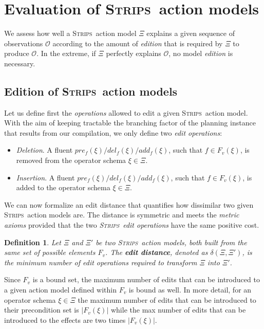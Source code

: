 \documentclass{article}
\newcommand{\strips}{\textsc{Strips}}     %
\newtheorem{definition}[theorem]{Definition}
\begin{document}
\section{Evaluation of \strips\ action models}
We assess how well a \strips\ action model $\Xi$ explains a given sequence of observations $\mathcal{O}$ according to the amount of {\em edition} that is required by $\Xi$ to produce $\mathcal{O}$. In the extreme, if $\Xi$ perfectly explains $\mathcal{O}$, no model {\em edition} is necessary.

\subsection{Edition of \strips\ action models}
Let us define first the \emph{operations} allowed to edit a given \strips\ action model. With the aim of keeping tractable the branching factor of the planning instance that results from our compilation, we only define two {\em edit operations}:
\begin{itemize}
\item {\em Deletion}. A fluent $pre_f(\xi)/del_f(\xi)/add_f(\xi)$, such that $f\in F_v(\xi)$, is removed from the operator schema $\xi\in\Xi$.
\item {\em Insertion}. A fluent $pre_f(\xi)/del_f(\xi)/add_f(\xi)$, such that $f\in F_v(\xi)$, is added to the operator schema $\xi\in\Xi$.
\end{itemize}

We can now formalize an edit distance that quantifies how dissimilar two given \strips\ action models are. The distance is symmetric and meets the {\em metric axioms} provided that the two {\em \strips\ edit operations} have the same positive cost.

\begin{definition}
Let $\Xi$ and $\Xi'$ be two \strips\ action models, both built from the same set of possible elements $F_v$. The {\bf edit distance}, denoted as $\delta(\Xi,\Xi')$, is the minimum number of {\em edit operations} required to transform $\Xi$ into $\Xi'$.
\end{definition}

Since $F_v$ is a bound set, the maximum number of edits that can be introduced to a given action model defined within $F_v$ is bound as well. In more detail, for an operator schema $\xi\in\Xi$ the maximum number of edits that can be introduced to their precondition set is $|F_v(\xi)|$ while the max number of edits that can be introduced to the effects are two times $|F_v(\xi)|$.
\end{document}
